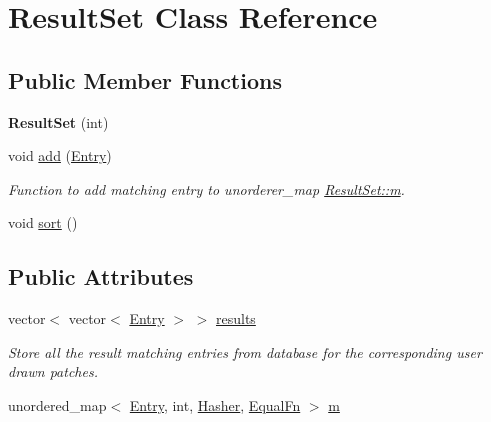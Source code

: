 \hypertarget{classResultSet}{\section{\-Result\-Set \-Class \-Reference}
\label{classResultSet}
}
\subsection*{\-Public \-Member \-Functions}
\begin{DoxyCompactItemize}
\item 
\hypertarget{classResultSet_ae169a7b3c0631dfd5048ec55c46a669e}{{\bfseries \-Result\-Set} (int)}\label{classResultSet_ae169a7b3c0631dfd5048ec55c46a669e}

\item 
void \hyperlink{classResultSet_a4eca226d7033e0faa1c29911829a657c}{add} (\hyperlink{classEntry}{\-Entry})
\begin{DoxyCompactList}\small\item\em \-Function to add matching entry to unorderer\-\_\-map \hyperlink{classResultSet_ad62d4fd4f4e32c4dec4ddfd6ee1ec4dc}{\-Result\-Set\-::m}. \end{DoxyCompactList}\item 
void \hyperlink{classResultSet_a81983f9f4106c9202239f766994d5de0}{sort} ()
\end{DoxyCompactItemize}
\subsection*{\-Public \-Attributes}
\begin{DoxyCompactItemize}
\item 
vector$<$ vector$<$ \hyperlink{classEntry}{\-Entry} $>$ $>$ \hyperlink{classResultSet_af94fb0e3ab0007c7c0369e6fbb3a2f86}{results}
\begin{DoxyCompactList}\small\item\em \-Store all the result matching entries from database for the corresponding user drawn patches. \end{DoxyCompactList}\item 
unordered\-\_\-map$<$ \hyperlink{classEntry}{\-Entry}, int, \*
\hyperlink{classHasher}{\-Hasher}, \hyperlink{classEqualFn}{\-Equal\-Fn} $>$ \hyperlink{classResultSet_ad62d4fd4f4e32c4dec4ddfd6ee1ec4dc}{m}
\end{DoxyCompactItemize}


